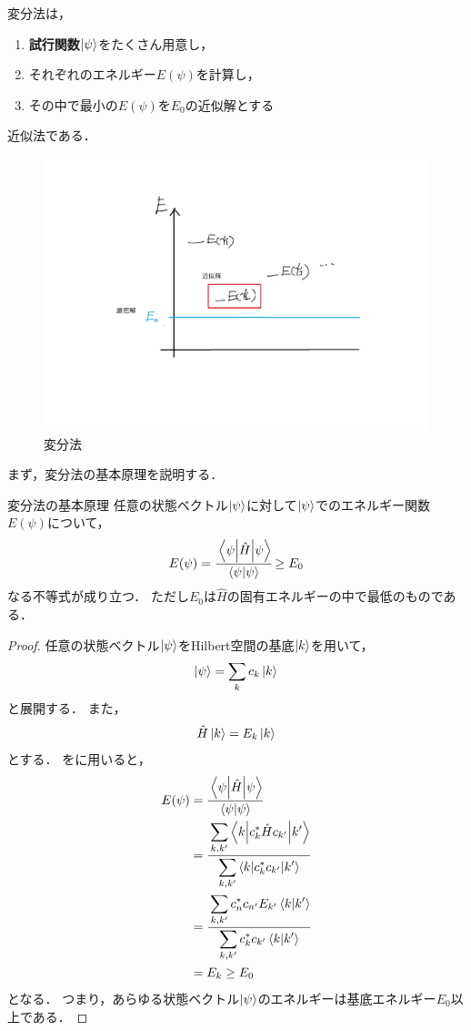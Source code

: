 \documentclass{report}
\begin{document}
  変分法は，
  \begin{screen}
    \begin{enumerate}
      \item \textbf{試行関数}$\ket{\psi}$をたくさん用意し，
      \item それぞれのエネルギー$E(\psi)$を計算し，
      \item その中で最小の$E(\psi)$を$E_0$の近似解とする
    \end{enumerate}
  \end{screen}
  近似法である．
  \begin{figure}[H]
    \centering
    \includegraphics[width=0.6\columnwidth]{fig/variational_pmethod.pdf}
    \caption{変分法}
    \label{variational-image}
  \end{figure}
  まず，変分法の基本原理を説明する．
  \begin{itembox}[l]{変分法の基本原理}
    任意の状態ベクトル$\ket{\psi}$に対して$\ket{\psi}$でのエネルギー関数$E(\psi)$について，
    \begin{align}
      E(\psi) = \cfrac{\mel**{\psi}{\hat{H}}{\psi}}{\braket{\psi}} \geq E_0 \label{minimum}
    \end{align}
    なる不等式が成り立つ．
    ただし$E_0$は$\hat{H}$の固有エネルギーの中で最低のものである．
  \end{itembox}
  \begin{proof}
    任意の状態ベクトル$\ket{\psi}$をHilbert空間の基底$\ket{k}$を用いて，
    \begin{align}
      \ket{\psi} = \sum_{k} c_k\ket{k} \label{basis_expansion}
    \end{align}
    と展開する．
    また，
    \begin{align}
      \hat{H}\ket{k} = E_k\ket{k}
    \end{align}
    とする．
    をに用いると，
    \begin{align}
      E(\psi) &= \cfrac{\mel**{\psi}{\hat{H}}{\psi}}{\braket{\psi}} \\ 
      &= \cfrac{\displaystyle \sum_{k, k'}\mel**{k}{c_k^*\hat{H}c_{k'}}{k'}}{\displaystyle \sum_{k, k'}\mel**{k}{c_k^*c_{k'}}{k'}} \\ 
      &= \cfrac{\displaystyle \sum_{k, k'}c_n^*c_{n'}E_{k'}\braket{k}{k'}}{\displaystyle \sum_{k, k'}c_k^*c_{k'}\braket{k}{k'}} \\ 
      &= E_k \geq E_0
    \end{align}
    となる．
    つまり，あらゆる状態ベクトル$\ket{\psi}$のエネルギーは基底エネルギー$E_0$以上である．
  \end{proof}
\end{document}
